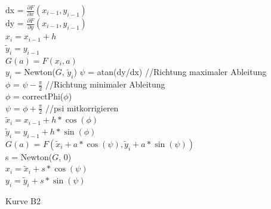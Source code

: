 \documentclass[a4paper,11pt,bibliography=totoc,listof=totoc,headinclude=true,cleardoublepage=empty,oneside]{scrartcl}
\newcommand{\diff}[2]{\frac{\partial #1}{\partial #2}}
\begin{document}
\begin{algorithm}[h]
	\label{alg:B_V2}
	{
		dx = $\diff{F}{x}(x_{i-1},y_{i-1})$\\
		dy = $\diff{F}{y}(x_{i-1},y_{i-1})$\\
		{
			$x_i = x_{i-1}+h$\\
			$\tilde y_i = y_{i-1}$\\
			$G(a) = F(x_i,a)$\\
			$y_i$ = Newton($G$, $\tilde y_i$)	
		}
		{
			$\psi$ = atan(dy/dx)			//Richtung maximaler Ableitung\\
			$\phi$ = $\psi-\frac{\pi}{2}$	//Richtung minimaler Ableitung\\
			$\phi$ = correctPhi($\phi$)\\
			$\psi$ = $\phi+\frac{\pi}{2}$	//psi mitkorrigieren\\
			$\tilde x_i = x_{i-1}+h*\cos(\phi)$\\
			$\tilde y_i = y_{i-1}+h*\sin(\phi)$\\
			$G(a)$ = $F(\tilde x_i+a*\cos(\psi),\tilde y_i+a*\sin(\psi))$\\
			s = Newton($G$, 0)\\
			$x_i = \tilde x_{i}+s*\cos(\psi)$\\
			$y_i = \tilde y_{i}+s*\sin(\psi)$\\
		}
	}
	\caption{Kurve B2}
\end{algorithm}
\end{document}
